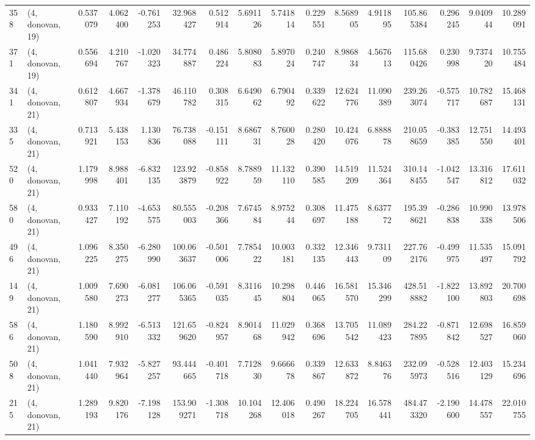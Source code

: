 \begin{tabular}{llrrrrrrrrrrrrrr}
358 &  (4, donovan, 19) &   0.537079 &   4.062400 &  -0.761253 &    32.968427 &   0.512914 &   5.691126 &   5.741814 &  0.229551 &   8.568905 &   4.911895 &    105.865384 &   0.296245 &    9.040944 &   10.289091 \\
371 &  (4, donovan, 19) &   0.556694 &   4.210767 &  -1.020323 &    34.774887 &   0.486224 &   5.808083 &   5.897024 &  0.240747 &   8.986834 &   4.567613 &    115.680426 &   0.230998 &    9.737420 &   10.755484 \\
341 &  (4, donovan, 21) &   0.612807 &   4.667934 &  -1.378679 &    46.110782 &   0.308315 &   6.649062 &   6.790492 &  0.339622 &  12.624776 &  11.090389 &    239.263074 &  -0.575717 &   10.782687 &   15.468131 \\
335 &  (4, donovan, 21) &   0.713921 &   5.438153 &   1.130836 &    76.738088 &  -0.151111 &   8.686731 &   8.760028 &  0.280420 &  10.424076 &   6.888878 &    210.058659 &  -0.383385 &   12.751550 &   14.493401 \\
520 &  (4, donovan, 21) &   1.179998 &   8.988401 &  -6.832135 &   123.923879 &  -0.858922 &   8.788959 &  11.132110 &  0.390585 &  14.519209 &  11.524364 &    310.148455 &  -1.042547 &   13.316812 &   17.611032 \\
580 &  (4, donovan, 21) &   0.933427 &   7.110192 &  -4.653575 &    80.555003 &  -0.208366 &   7.674584 &   8.975244 &  0.308697 &  11.475188 &   8.637772 &    195.398621 &  -0.286838 &   10.990338 &   13.978506 \\
496 &  (4, donovan, 21) &   1.096225 &   8.350275 &  -6.280990 &   100.063637 &  -0.501006 &   7.785422 &  10.003181 &  0.332135 &  12.346443 &   9.731109 &    227.762176 &  -0.499975 &   11.535497 &   15.091792 \\
149 &  (4, donovan, 21) &   1.009580 &   7.690273 &  -6.081277 &   106.065365 &  -0.591035 &   8.311645 &  10.298804 &  0.446065 &  16.581570 &  15.346299 &    428.518882 &  -1.822100 &   13.892803 &   20.700698 \\
586 &  (4, donovan, 21) &   1.180590 &   8.992910 &  -6.513332 &   121.659620 &  -0.824957 &   8.901468 &  11.029942 &  0.368696 &  13.705542 &  11.089423 &    284.227895 &  -0.871842 &   12.698527 &   16.859060 \\
508 &  (4, donovan, 21) &   1.041440 &   7.932964 &  -5.827257 &    93.444665 &  -0.401718 &   7.712830 &   9.666678 &  0.339867 &  12.633872 &   8.846376 &    232.095973 &  -0.528516 &   12.403129 &   15.234696 \\
215 &  (4, donovan, 21) &   1.289193 &   9.820176 &  -7.198128 &   153.909271 &  -1.308718 &  10.104268 &  12.406018 &  0.490267 &  18.224705 &  16.578441 &    484.473320 &  -2.190600 &   14.478557 &   22.010755 \\

\end{tabular}
